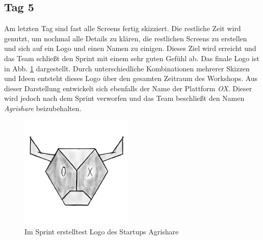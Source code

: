 \subsection*{\label{sec:Sprint-Umsetzung-Tag5}\thesubsection\quad Tag 5}Am letzten Tag sind fast alle Screens fertig skizziert. Die restliche Zeit wird genutzt, um nochmal alle Details zu klären, die restlichen Screens zu erstellen und sich auf ein Logo und einen Namen zu einigen. Dieses Ziel wird erreicht und das Team schließt den Sprint mit einem sehr guten Gefühl ab. Das finale Logo ist in Abb. \ref{fig:logoAgrishare} dargestellt. Durch unterschiedliche Kombinationen mehrerer Skizzen und Ideen entsteht dieses Logo über den gesamten Zeitraum des Workshops. Aus dieser Darstellung entwickelt sich ebenfalls der Name der Plattform \textit{OX}. Dieser wird jedoch nach dem Sprint verworfen und das Team beschließt den Namen \textit{Agrishare} beizubehalten. 
\begin{figure}
	\begin{center}
		\includegraphics[width=0.48\textwidth]{99_IMG/03_Umsetzung/Skizzeheller.png}
	\end{center}
  \caption{Im Sprint erstelltest Logo des Startups Agrishare}
		\label{fig:logoAgrishare}
\end{figure}


